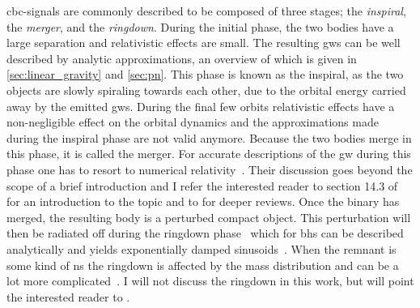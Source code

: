 \acrshort{cbc}-signals are commonly described to be composed of three stages; the \emph{inspiral}, the \emph{merger}, and the \emph{ringdown}. During the initial phase, the two bodies have a large separation and relativistic effects are small. The resulting \acrshort{gw}s can be well described by analytic approximations, an overview of which is given in \autoref{sec:linear_gravity} and \autoref{sec:pn}. This phase is known as the inspiral, as the two objects are slowly spiraling towards each other, due to the orbital energy carried away by the emitted \acrshort{gw}s. During the final few orbits relativistic effects have a non-negligible effect on the orbital dynamics and the approximations made during the inspiral phase are not valid anymore. Because the two bodies merge in this phase, it is called the merger. For accurate descriptions of the \acrshort{gw} during this phase one has to resort to numerical relativity~\cite{Maggiore:2008aaa}. %
Their discussion goes beyond the scope of a brief introduction and I refer the interested reader to section 14.3 of \cite{Maggiore:2018aaa} for an introduction to the topic and to \cite{Pretorius:2007nq, Hannam:2009rd, Hinder:2010vn, Centrella:2010zf} for deeper reviews. Once the binary has merged, the resulting body is a perturbed compact object. This perturbation will then be radiated off during the ringdown phase~\cite{Nollert:1999ji} which for \acrshort{bh}s can be described analytically and yields exponentially damped sinusoids~\cite{Nollert:1999ji}. When the remnant is some kind of \acrshort{ns} the ringdown is affected by the mass distribution and can be a lot more complicated~\cite{Bauswein:2012ya}. I will not discuss the ringdown in this work, but will point the interested reader to \cite{Kokkotas:1999bd}.

